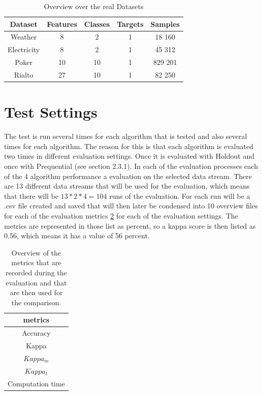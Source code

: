 \documentclass[12pt,oneside,a4paper,parskip]{scrbook}
\begin{document}
\begin{table}[H]
  \label{tab:realdata}
  \centering
  \begin{tabular} {|| c c c c c ||} 
    \hline
      Dataset & Features & Classes & Targets & Samples \\
    \hline\hline
      Weather & 8 & 2 & 1 & 18 160 \\
    \hline 
      Electricity & 8 & 2 & 1 & 45 312 \\
    \hline
      Poker & 10 & 10 & 1 & 829 201 \\
    \hline
      Rialto & 27 & 10 & 1 & 82 250 \\
    \hline
  \end{tabular} 
  \caption{Overview over the real Datasets}
\end{table}

\section{Test Settings}

The test is run several times for each algorithm that is tested and also several times for each algorithm.
The reason for this is that each algorithm is evaluated two times in different evaluation settings.
Once it is evaluated with Holdout and once with Prequential (see section 2.3.1).
In each of the evaluation processes each of the 4 algorithm performance a evaluation on the selected data stream.
There are 13 different data streams that will be used for the evaluation, which means that there will be $13*2*4=104$ 
runs of the evaluation.
For each run will be a .csv file created and saved that will then later be condensed into 10 overview files for each of the 
evaluation metrics \ref{tab:metrics} for each of the evaluation settings.
The metrics are represented in those list as percent, so a kappa score is then listed as 0.56, which means it has a value of 56 percent.

\begin{table}[H]
  \centering
    \begin{tabular} {|| c ||} 
      \hline
        metrics \\
      \hline\hline
        Accuracy  \\
      \hline 
        Kappa  \\
      \hline
        $Kappa_m$  \\
      \hline
        $Kappa_t$  \\
      \hline
        Computation time  \\
      \hline
    \end{tabular} 
  \caption{Overview of the metrics that are recorded during the evaluation and that are then used for the comparison.}
  \label{tab:metrics}
\end{table}
\end{document}
